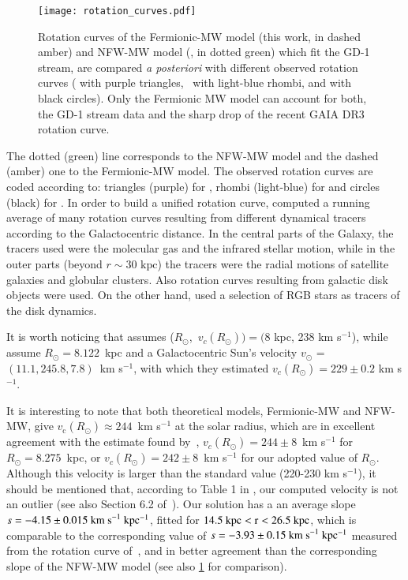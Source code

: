 \documentclass[twocolumn]{aa}
\begin{document}
\begin{figure}
   \centering
   \texttt{[image: rotation\_curves.pdf]}
   \caption{Rotation curves of the Fermionic-MW model (this work, in dashed amber) and NFW-MW model (\cite{2019MNRAS.486.2995M}, in dotted green) which fit the GD-1 stream, are compared \textit{a posteriori} with different observed rotation curves (\citealp{Eilers_2019} with purple triangles,~\citealp{sofue_2020} with light-blue rhombi, and \citealp{Jiao2023} with black circles). Only the Fermionic MW model can account for both, the GD-1 stream data and the sharp drop of the recent GAIA DR3 rotation curve.}
   \label{fig:rotcurve}
\end{figure}


The dotted (green) line corresponds to the NFW-MW model and the dashed (amber) one to the Fermionic-MW model.
The observed rotation curves are coded according to: triangles (purple)
for \citet{Eilers_2019}, rhombi (light-blue) for \citet{sofue_2020} and
circles (black) for \citet{Jiao2023}.
In order to build a unified rotation curve, \citet{sofue_2020} computed a running average of many rotation curves resulting from different dynamical tracers according to the Galactocentric distance. In the central parts of the Galaxy, the tracers used were the molecular gas and the infrared stellar motion, while in the outer parts (beyond $r\sim30 \textrm{~kpc}$) the tracers were the radial motions of satellite galaxies and globular clusters. Also rotation curves resulting from galactic disk objects were used.
On the other hand, \citet{Eilers_2019} used a selection of RGB stars as tracers of the disk dynamics.

It is worth noticing  that \citet{sofue_2020} assumes
($R_\odot$,~$v_c(R_\odot))=(8$ kpc, 238 km s$^{-1}$), while \citet{Eilers_2019}
assume $R_\odot=8.122$~kpc and a Galactocentric Sun's velocity $v_\odot$ = $(11.1, 245.8, 7.8)$~km s$^{-1}$,
with which they estimated $v_c(R_\odot)=229\pm0.2$ km s$^{-1}$.

It is interesting to note that both theoretical models, Fermionic-MW and NFW-MW, give $v_\mathrm{c}(R_\odot)\approx 244$~km s$^{-1}$ at the solar radius, which are in excellent agreement with the estimate found
by~\citet{2020arXiv201202169B}, $v_c(R_\odot)=244\pm 8$~km s$^{-1}$ for $R_\odot = 8.275$~kpc, or $v_c(R_\odot)=242\pm 8$~km s$^{-1}$ for our adopted value of $R_\odot$. Although this velocity is larger than the standard value (220-230 km s$^{-1}$), it should be mentioned
that, according to Table 1 in \citet{sofue_2020}, our computed velocity is not an outlier (see also Section 6.2 of~\citealt{Honma_2012}).
Our solution has a an average slope $s=-4.15\pm0.015~\rm{km~s}^{-1}~kpc^{-1}$, fitted for $14.5~\rm{kpc} < r < 26.5~\rm{kpc}$, which is
comparable to the corresponding value of $s=-3.93\pm0.15~\rm{km~s}^{-1}~kpc^{-1}$ measured from the rotation curve of~\citet{Jiao2023}, and in better agreement than the corresponding slope of the NFW-MW model (see also \cref{fig:rotcurve} for comparison).
\end{document}
